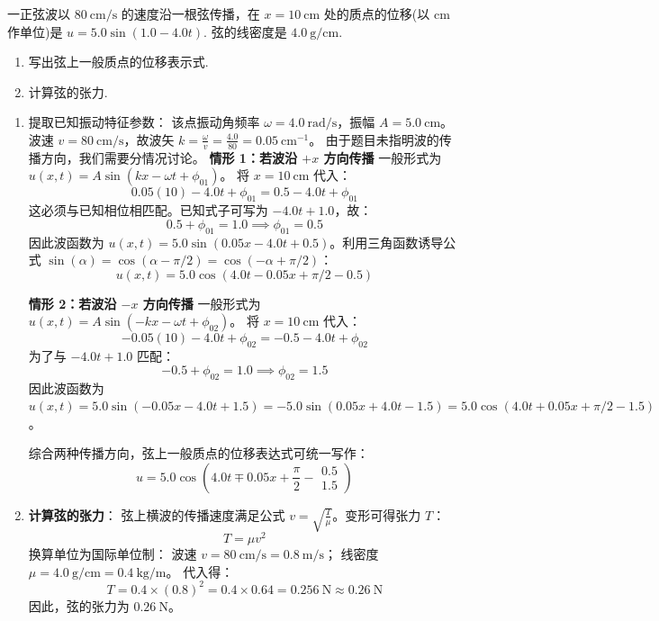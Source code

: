 \begin{exercise}\label{ex:8.15}
一正弦波以 $80 \ \mathrm{cm/s}$ 的速度沿一根弦传播，在 $x = 10 \ \mathrm{cm}$ 处的质点的位移(以 $\mathrm{cm}$ 作单位)是 $u = 5.0\sin(1.0 - 4.0t)$. 弦的线密度是 $4.0 \ \mathrm{g/cm}$.
\begin{enumerate}
  \item[(a)] 写出弦上一般质点的位移表示式.
  \item[(b)] 计算弦的张力.
\end{enumerate}
\end{exercise}
\begin{solution}
\begin{enumerate}
    \item[(a)] 提取已知振动特征参数：
    该点振动角频率 $\omega = 4.0 \ \mathrm{rad/s}$，振幅 $A = 5.0 \ \mathrm{cm}$。
    波速 $v = 80 \ \mathrm{cm/s}$，故波矢 $k = \frac{\omega}{v} = \frac{4.0}{80} = 0.05 \ \mathrm{cm^{-1}}$。
    由于题目未指明波的传播方向，我们需要分情况讨论。
    \textbf{情形 1：若波沿 $+x$ 方向传播}
    一般形式为 $u(x,t) = A \sin(kx - \omega t + \phi_{01})$。
    将 $x = 10 \ \mathrm{cm}$ 代入：
    $$ 0.05(10) - 4.0t + \phi_{01} = 0.5 - 4.0t + \phi_{01} $$
    这必须与已知相位相匹配。已知式子可写为 $-4.0t + 1.0$，故：
    $$ 0.5 + \phi_{01} = 1.0 \implies \phi_{01} = 0.5 $$
    因此波函数为 $u(x,t) = 5.0 \sin(0.05x - 4.0t + 0.5)$。利用三角函数诱导公式 $\sin(\alpha) = \cos(\alpha - \pi/2) = \cos(-\alpha + \pi/2)$：
    $$ u(x,t) = 5.0 \cos(4.0t - 0.05x + \pi/2 - 0.5) $$

    \textbf{情形 2：若波沿 $-x$ 方向传播}
    一般形式为 $u(x,t) = A \sin(-kx - \omega t + \phi_{02})$。
    将 $x = 10 \ \mathrm{cm}$ 代入：
    $$ -0.05(10) - 4.0t + \phi_{02} = -0.5 - 4.0t + \phi_{02} $$
    为了与 $-4.0t + 1.0$ 匹配：
    $$ -0.5 + \phi_{02} = 1.0 \implies \phi_{02} = 1.5 $$
    因此波函数为 $u(x,t) = 5.0 \sin(-0.05x - 4.0t + 1.5) = -5.0 \sin(0.05x + 4.0t - 1.5) = 5.0 \cos(4.0t + 0.05x + \pi/2 - 1.5)$。
    
    综合两种传播方向，弦上一般质点的位移表达式可统一写作：
    $$ u = 5.0 \cos \left( 4.0t \mp 0.05x + \frac{\pi}{2} - \begin{matrix} 0.5 \\ 1.5 \end{matrix} \right) $$

    \item[(b)] \textbf{计算弦的张力}：
    弦上横波的传播速度满足公式 $v = \sqrt{\frac{T}{\mu}}$。变形可得张力 $T$：
    $$ T = \mu v^2 $$
    换算单位为国际单位制：
    波速 $v = 80 \ \mathrm{cm/s} = 0.8 \ \mathrm{m/s}$；
    线密度 $\mu = 4.0 \ \mathrm{g/cm} = 0.4 \ \mathrm{kg/m}$。
    代入得：
    $$ T = 0.4 \times (0.8)^2 = 0.4 \times 0.64 = 0.256 \ \mathrm{N} \approx 0.26 \ \mathrm{N} $$
    因此，弦的张力为 $0.26 \ \mathrm{N}$。
\end{enumerate}
\end{solution}

